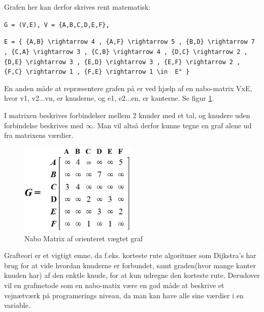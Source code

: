 Grafen her kan derfor skrives rent matematisk:

\vspace{5mm}

\verb!G = (V,E), V = {A,B,C,D,E,F},! 

\vspace{5mm}

\verb!E = { {A,B} \rightarrow 4 , {A,F} \rightarrow 5 , {B,D} \rightarrow 7 , {C,A} \rightarrow 3 , {C,B} \rightarrow 4 , {D,C} \rightarrow 2 ,! \\
\verb!{D,E} \rightarrow 3 , {E,D} \rightarrow 3 , {E,F} \rightarrow 2 , {F,C} \rightarrow 1 , {F,E} \rightarrow 1 \in  E" }!

\vspace{5mm}

En anden måde at repræsentere grafen på er ved hjælp af en nabo-matrix VxE, hvor v1, v2...vn, er knuderne, og e1, e2...en, er kanterne. Se figur \ref{fig:adjacency-matrix-weighted-directed-graph}. 

I matrixen beskrives forbindelser mellem 2 knuder med et tal, og knudere uden forbindelse beskrives med $\infty$. Man vil altså derfor kunne tegne en graf alene ud fra matrixens værdier.

\begin{figure}[H]
\begin{adjustbox}{width=0.5\textwidth,center=\textwidth}
\centering
\includegraphics[width=0.5\textwidth]{Pictures/Teoriafsnit/Figurfiler/adjacency_matrix_weighted_directed_graph.PNG}
\end{adjustbox}
\caption{Nabo Matrix af orienteret vægtet graf}
\label{fig:adjacency-matrix-weighted-directed-graph}
\end{figure}

Grafteori er et vigtigt emne, da f.eks. korteste rute algoritmer som Dijkstra's har brug for at vide hvordan knuderne er forbundet, samt graden(hvor mange kanter knuden har) af den enktle knude, for at kun udregne den korteste rute. Derudover vil en grafmetode som en nabo-matix være en god måde at beskrive et vejnætværk på programerings niveau, da man kan have alle sine værdier i en variable.


